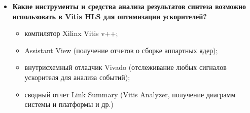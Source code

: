 \begin{itemize}[left=-0.5\parindent]
    \item \textbf{Какие инструменты и средства анализа результатов синтеза
          возможно использовать в Vitis HLS для оптимизации ускорителей?}
        \begin{itemize}[leftmargin=\parindent]
            \item компилятор Xilinx Vitis v++;
            \item Assistant View (получение отчетов о сборке аппартных ядер);
            \item внутрисхемный отладчик Vivado (отслеживание любых сигналов
                  ускорителя для анализа событий);
            \item сводный отчет Link Summary (Vitis Analyzer, получение
                  диаграмм системы и платформы и др.)
        \end{itemize}
\end{itemize}
